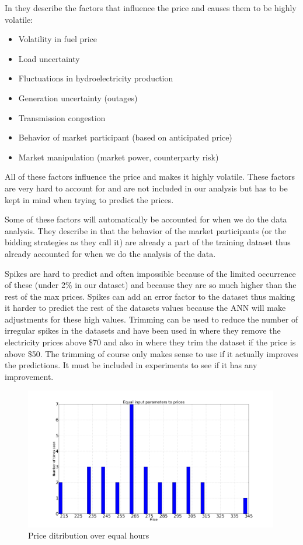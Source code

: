In \cite{singhal2011electricity} they describe the factors that influence the price and causes them to be highly volatile:
\begin{itemize}
	\item Volatility in fuel price
 	\item Load uncertainty
 	\item Fluctuations in hydroelectricity production
 	\item Generation uncertainty (outages)
 	\item Transmission congestion
 	\item Behavior of market participant (based on anticipated price)
 	\item Market manipulation (market power, counterparty risk)
\end{itemize}
All of these factors influence the price and makes it highly volatile. These factors are very hard to account for and are not included in our analysis but has to be kept in mind when trying to predict the prices. 

Some of these factors will automatically be accounted for when we do the data analysis. They describe in \cite{yamin2004adaptive} that the behavior of the market participants (or the bidding strategies as they call it) are already a part of the training dataset thus already accounted for when we do the analysis of the data.

Spikes are hard to predict and often impossible because of the limited occurrence of these (under 2\% in our dataset) and because they are so much higher than the rest of the max prices. Spikes can add an error factor to the dataset thus making it harder to predict the rest of the datasets values because the ANN will make adjustments for these high values. Trimming can be used to reduce the number of irregular spikes in the datasets and have been used in \cite{singhal2011electricity} where they remove the electricity prices above \$70 and also in \cite{yamin2004adaptive} where they trim the dataset if the price is above \$50. The trimming of course only makes sense to use if it actually improves the predictions. It must be included in experiments to see if it has any improvement.

\begin{figure}[H]
\centering
\includegraphics[width=0.99\textwidth ]{billeder/energy_price_plots/same_hour_distribution.png}
\caption{Price ditribution over equal hours}
\label{fig:same_hour_distribution}
\end{figure}

